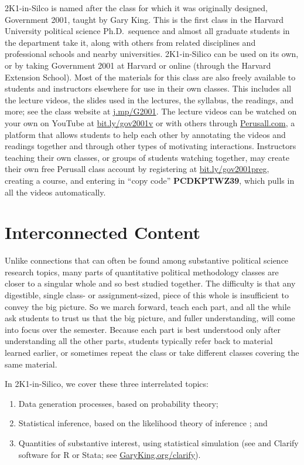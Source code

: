 \documentclass[12pt]{article}
\theoremstyle{definition}
\begin{document}
2K1-in-Silco is named after the class for which it was originally designed, Government 2001, taught by Gary King. This is the first class in the Harvard University political science Ph.D.\ sequence and almost all graduate students in the department take it, along with others from related disciplines and professional schools and nearby universities. 2K1-in-Silico can be used on its own, or by taking Government 2001 at Harvard or online (through the Harvard Extension School).  Most of the materials for this class are also freely available to students and instructors elsewhere for use in their own classes. This includes all the lecture videos, the slides used in the lectures, the syllabus, the readings, and more; see the class website at \href{https://j.mp/G2001}{j.mp/G2001}. The lecture videos can be watched on your own on YouTube at \href{https://bit.ly/gov2001v}{bit.ly/gov2001v} or with others through \href{https://perusall.com}{Perusall.com}, a platform that allows students to help each other by annotating the videos and readings together and through other types of motivating interactions. Instructors teaching their own classes, or groups of students watching together, may create their own free Perusall class account by registering at \href{https://bit.ly/gov2001preg}{bit.ly/gov2001preg}, creating a course, and entering in ``copy code'' \textbf{PCDKPTWZ39}, which pulls in all the videos automatically.

\section{Interconnected Content}

Unlike connections that can often be found among substantive political science research topics, many parts of quantitative political methodology classes are closer to a singular whole and so best studied together. The difficulty is that any digestible, single class- or assignment-sized, piece of this whole is insufficient to convey the big picture. So we march forward, teach each part, and all the while ask students to trust us that the big picture, and fuller understanding, will come into focus over the semester. Because each part is best understood only after understanding all the other parts, students typically refer back to material learned earlier, or sometimes repeat the class or take different classes covering the same material.

In 2K1-in-Silico, we cover these three interrelated topics:
\begin{enumerate}\singlespacing
  \item Data generation processes, based on probability theory;
  \item Statistical inference, based on the likelihood theory of inference \citep{King98}; and
  \item Quantities of substantive interest, using statistical simulation (see \citealt{KinTomWit00} and Clarify software for R or Stata; see \href{https://GaryKing.org/clarify}{GaryKing.org/clarify}).
\end{enumerate}
\end{document}
